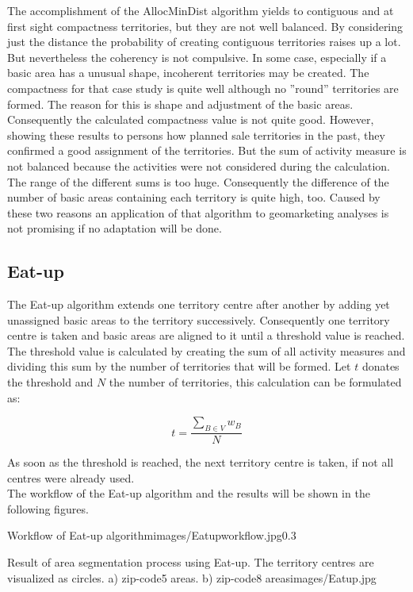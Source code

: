 The accomplishment of the AllocMinDist algorithm yields to contiguous and at first sight compactness territories, but they are not well balanced. By considering just the distance the probability of creating contiguous territories raises up a lot. But nevertheless the coherency is not compulsive. In some case, especially if a basic area has a unusual shape, incoherent territories may be created. The compactness for that case study is quite well although no ''round'' territories are formed. The reason for this is shape and adjustment of the basic areas. Consequently the calculated compactness value is not quite good. However, showing these results to persons how planned sale territories in the past, they confirmed a good assignment of the territories. But the sum of activity measure is not balanced because the activities were not considered during the calculation. The range of the different sums is too huge. Consequently the difference of the number of basic areas containing each territory is quite high, too. Caused by these two reasons an application of that algorithm to geomarketing analyses is not promising if no adaptation will be done.

\subsection{Eat-up}

The Eat-up algorithm extends one territory centre after another by adding yet unassigned basic areas to the territory successively. Consequently one territory centre is taken and basic areas are aligned to it until a threshold value is reached. The threshold value is calculated by creating the sum of all activity measures and dividing this sum by the number of territories that will be formed. Let $t$ donates the threshold and $N$ the number of territories, this calculation can be formulated as:

\[ \mathit{t  = \frac{\sum\nolimits  _{B \in V} w_{B}}{N}}\]

As soon as the threshold is reached, the next territory centre is taken, if not all centres were already used. \\
The workflow of the Eat-up algorithm and the results will be shown in the following figures.

\begin{figurevarSize}{Workflow of Eat-up algorithm}{images/Eatupworkflow.jpg}{0.3}\end{figurevarSize}

\begin{figureOwn}{Result of area segmentation process using Eat-up. The territory centres are visualized as circles. a) zip-code5 areas. b) zip-code8 areas}{images/Eatup.jpg}\end{figureOwn}


